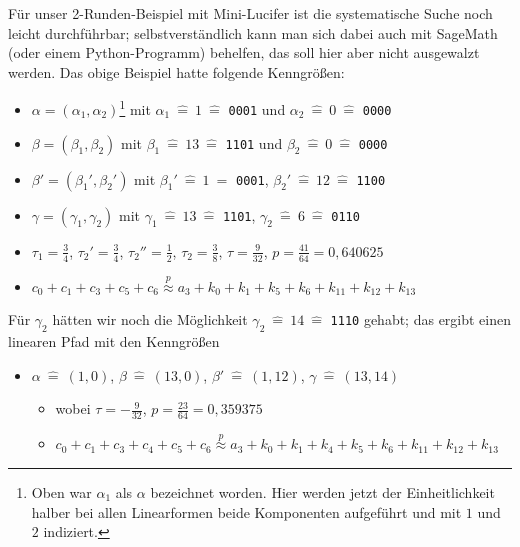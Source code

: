 \begin{refsegment}
Für unser 2-Runden-Beispiel mit Mini-Lucifer
ist die systematische Suche
noch leicht durchführbar; selbstverständlich kann man sich dabei auch
mit SageMath (oder einem Python-Programm) behelfen, das soll hier aber nicht
ausgewalzt werden. Das obige Beispiel hatte folgende Kenngrößen:
\begin{itemize}
   \item $\alpha = (\alpha_1,\alpha_2)$\footnote{%
      Oben war $\alpha_1$ als $\alpha$ bezeichnet worden. Hier werden jetzt der
      Einheitlichkeit halber bei allen Linearformen beide Komponenten
      aufgeführt und mit $1$ und $2$ indiziert.
      } mit $\alpha_1 \:\hat{=}\: 1 \:\hat{=}$ \verb:0001: und
      $\alpha_2 \:\hat{=}\: 0 \:\hat{=}$ \verb:0000:
   \item $\beta = (\beta_1,\beta_2)$ mit $\beta_1 \:\hat{=}\: 13 \:\hat{=}$
      \verb:1101: und $\beta_2 \:\hat{=}\: 0 \:\hat{=}$ \verb:0000:
   \item $\beta' = (\beta_1',\beta_2')$ mit $\beta_1' \:\hat{=}\: 1\:\hat{=}$
      \verb:0001:, $\beta_2' \:\hat{=}\: 12 \:\hat{=}$ {\tt 1100}
   \item $\gamma = (\gamma_1,\gamma_2)$ mit $\gamma_1 \:\hat{=}\: 13 \:\hat{=}$
       \verb:1101:, $\gamma_2 \:\hat{=}\: 6 \:\hat{=}$ \verb:0110:
   \item $\tau_1 = \frac{3}{4}$, $\tau_2' = \frac{3}{4}$,
      $\tau_2'' = \frac{1}{2}$, $\tau_2 = \frac{3}{8}$,
      $\tau = \frac{9}{32}$, $p = \frac{41}{64} = 0,640625$
   \item $c_0 + c_1 + c_3 + c_5 + c_6 \stackrel{p}{\approx}
      a_3 + k_0 + k_1 + k_5 + k_6 + k_{11} + k_{12} + k_{13}$
\end{itemize}
Für $\gamma_2$ hätten wir noch die Möglichkeit $\gamma_2 \:\hat{=}\: 14 \:\hat{=}$
\verb:1110: gehabt; das ergibt einen linearen Pfad mit den Kenngrößen
\begin{itemize}
   \item $\alpha \:\hat{=}\: (1,0)$, $\beta \:\hat{=}\: (13,0)$, $\beta' \:\hat{=}\: (1,12)$,
      $\gamma \:\hat{=}\: (13,14)$
   \begin{itemize}
      \item wobei $\tau = -\frac{9}{32}$, $p = \frac{23}{64} = 0,359375$
      \item $c_0 + c_1 + c_3 + c_4 + c_5 + c_6 \stackrel{p}{\approx}
         a_3 + k_0 + k_1 + k_4 + k_5 + k_6 + k_{11} + k_{12} + k_{13}$
   \end{itemize}
\end{itemize}

\end{refsegment}
